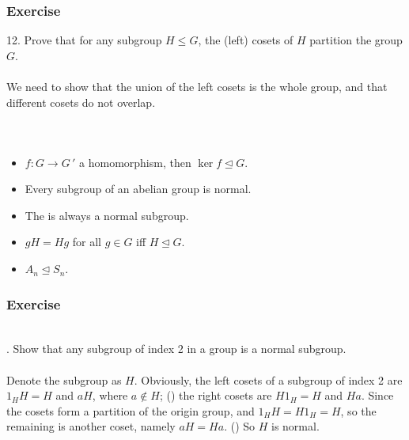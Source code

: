 \documentclass{beamer}
\newcommand{\mysol}{\yellow{Solution:}\\}
\begin{document}
\begin{frame}
    \frametitle{Exercise}
    12. Prove that for any subgroup $H \leq G$, the
    (left) cosets of $H$ partition the group $G$.
    \\\vs{3em}
    \\
    \hh We need to show that the union of the left cosets is the whole group, and that
    different cosets do not overlap.
\end{frame}
\begin{frame}
    \frametitle{}
    \\\vs{1em}
    \begin{itemize}
        \item $f : G \to G\,'$ a homomorphism, then $\ker f \trianglelefteq G$.
        \item Every subgroup of an abelian group is normal.
        \item The \textbf{} is always a normal subgroup.
        \item $gH=Hg$ for all $g\in G$ if\mbox{f} $H \trianglelefteq G $. 
        \item $A_n\trianglelefteq S_n$.
    \end{itemize}
\end{frame}
\begin{frame}
    \frametitle{Exercise}
    \\
    . Show that any subgroup of index 2 in a group
    is a normal subgroup.\\
    \vv
    \mysol
    \hh Denote the subgroup as $H$. Obviously, the left cosets of a subgroup of index 2 are
    $1_H H= H$ and $aH$, where $a \not\in H$; () the right 
    cosets are $H 1_H=H$ and $Ha$. Since the cosets form a 
    partition of the origin group, and $1_H H = H 1_H =H $, so 
    the remaining is another coset, namely $aH=Ha$. () 
    So $H$ is normal.
    \\\vs{2em}
    \\
\end{frame}
\end{document}
